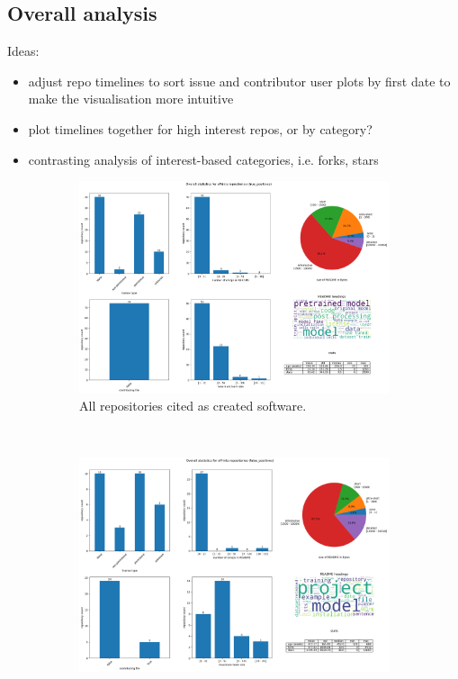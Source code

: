 \documentclass[10pt,a4paper]{scrartcl}
\begin{document}
\subsection*{Overall analysis}

Ideas: 
\begin{itemize}
    \item adjust repo timelines to sort issue and contributor user plots by first date to make the visualisation more intuitive
    \item plot timelines together for high interest repos, or by category?
    \item contrasting analysis of interest-based categories, i.e. forks, stars
\end{itemize}

\begin{figure}[h]
    \centering
    \begin{subfigure}[t]{0.8\textwidth}
        \centering
        \includegraphics[width=\textwidth]{../analysis/overall/overall_true_positives.png}
        \caption{All repositories cited as created software.}
        \label{fig:overall_tp}
    \end{subfigure}\\
    \begin{subfigure}[t]{0.8\textwidth}
        \centering
        \includegraphics[width=\textwidth]{../analysis/overall/overall_false_positives.png}

\end{subfigure}
\end{figure}
\end{document}
